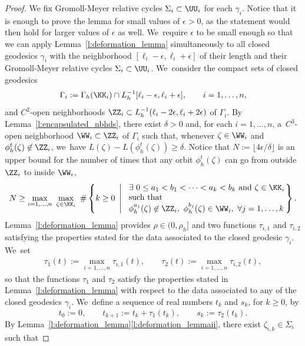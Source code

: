 \begin{proof}
We fix Gromoll-Meyer relative cycles $\Sigma_i\subset\UU_i$ for each $\gamma_i$.
Notice that it is enough to prove the lemma for small values of $\epsilon>0$, as the statement would then hold for larger values of $\epsilon$ as well. We~require $\epsilon$ to be small enough so that we can apply Lemma~\ref{l:deformation_lemma} simultaneously to all closed geodesics $\gamma_i$ with the neighborhood \hbox{$[\ell_i-\epsilon,\ell_i+\epsilon]$} of their length and their Gromoll-Meyer relative cycles $\Sigma_i\subset\UU_i$. We~consider the compact sets of closed geodesics
\[
\Gamma_i:=\Gamma_h(\KK_i)\cap L_h^{-1}[\ell_i-\epsilon,\ell_i+\epsilon],\qquad i=1,\dots,n,
\]
and $C^2$-open neighborhoods $\ZZ_i\subset L_h^{-1}(\ell_i-2\epsilon,\ell_i+2\epsilon)$ of $\Gamma_i$.
By Lemma~\ref{l:encapsulated_nbhds}, there exist $\delta>0$ and, for each $i=1,\dots,n$, a~$C^3$-open neighborhood $\WW_i\subset\ZZ_i$ of $\Gamma_i$ such that, whenever $\zeta\in\WW_i$ and $\phi_h^t(\zeta)\not\in\ZZ_i$, we~have $L(\zeta)-L(\phi_h^t(\zeta))\geq\delta$. Notice that $N:=\lfloor 4\epsilon/\delta \rfloor$ is an upper bound for the number of times that any orbit $\phi_h^t(\zeta)$ can go from outside $\ZZ_i$ to inside $\WW_i$, \ie
\begin{align*}
N
\geq
\max_{i=1,\dots,n}\
\max_{\zeta\in\KK_i}\ \#\left\{k\geq0\ \left|\
\begin{array}{l@{}}
\exists\ 0\leq a_1< b_1< \cdots< a_k< b_k\mbox{ and } \zeta\in\KK_i\\
\mbox{such that}\\
\phi_h^{a_j}(\zeta)\not\in\ZZ_i,\ \phi_h^{b_j}(\zeta)\in\WW_i,\ \forall j=1,\dots,k
\end{array}
\right.\right\}.
\end{align*}
Lemma~\ref{l:deformation_lemma} provides $\rho\in(0,\rho_h]$ and two functions $\tau_{i,1}$ and $\tau_{i,2}$ satisfying the properties stated for the data associated to the closed geodesic $\gamma_i$. We~set
\begin{align*}
\tau_1(t):=\max_{i=1,\dots,n} \tau_{i,1}(t),\qquad
\tau_2(t):=\max_{i=1,\dots,n} \tau_{i,2}(t),
\end{align*}
so that the functions $\tau_1$ and $\tau_2$ satisfy the properties stated in Lemma~\ref{l:deformation_lemma} with respect to the data associated to any of the closed geodesics $\gamma_i$. We~define a sequence of real numbers $t_k$ and $s_k$, for $k\geq0$, by
\[
t_0:=0,
\qquad
t_{k+1}:=t_k+\tau_1(t_k),
\qquad
s_k:=\tau_2(t_k).
\]
By Lemma~\ref{l:deformation_lemma}\eqref{l:deformation_lemmaii}, there exist $\zeta_{i,k}\in\Sigma_i$ such that

\end{proof}
